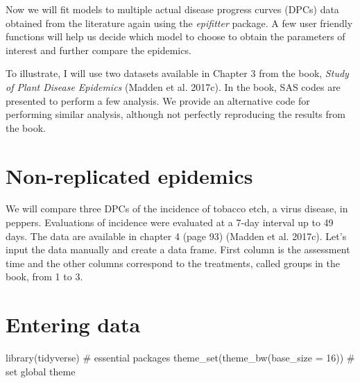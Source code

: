 \documentclass[
  letterpaper,
  DIV=11,
  numbers=noendperiod]{scrreprt}
\newenvironment{Shaded}{\begin{snugshade}}{\end{snugshade}}
\newcommand{\AttributeTok}[1]{\textcolor[rgb]{0.40,0.45,0.13}{#1}}
\newcommand{\CommentTok}[1]{\textcolor[rgb]{0.37,0.37,0.37}{#1}}
\newcommand{\DecValTok}[1]{\textcolor[rgb]{0.68,0.00,0.00}{#1}}
\newcommand{\FunctionTok}[1]{\textcolor[rgb]{0.28,0.35,0.67}{#1}}
\newcommand{\NormalTok}[1]{\textcolor[rgb]{0.00,0.23,0.31}{#1}}
\begin{document}
Now we will fit models to multiple actual disease progress curves (DPCs)
data obtained from the literature again using the \emph{epifitter}
package. A few user friendly functions will help us decide which model
to choose to obtain the parameters of interest and further compare the
epidemics.

To illustrate, I will use two datasets available in Chapter 3 from the
book, \emph{Study of Plant Disease Epidemics} (Madden et al. 2017c). In
the book, SAS codes are presented to perform a few analysis. We provide
an alternative code for performing similar analysis, although not
perfectly reproducing the results from the book.

\hypertarget{non-replicated-epidemics}{%
\section{Non-replicated epidemics}\label{non-replicated-epidemics}}

We will compare three DPCs of the incidence of tobacco etch, a virus
disease, in peppers. Evaluations of incidence were evaluated at a 7-day
interval up to 49 days. The data are available in chapter 4 (page 93)
(Madden et al. 2017c). Let's input the data manually and create a data
frame. First column is the assessment time and the other columns
correspond to the treatments, called groups in the book, from 1 to 3.

\hypertarget{entering-data}{%
\section{Entering data}\label{entering-data}}

\begin{Shaded}
\begin{Highlighting}[]
\FunctionTok{library}\NormalTok{(tidyverse) }\CommentTok{\# essential packages }
\FunctionTok{theme\_set}\NormalTok{(}\FunctionTok{theme\_bw}\NormalTok{(}\AttributeTok{base\_size =} \DecValTok{16}\NormalTok{)) }\CommentTok{\# set global theme}
\end{Highlighting}
\end{Shaded}
\end{document}

